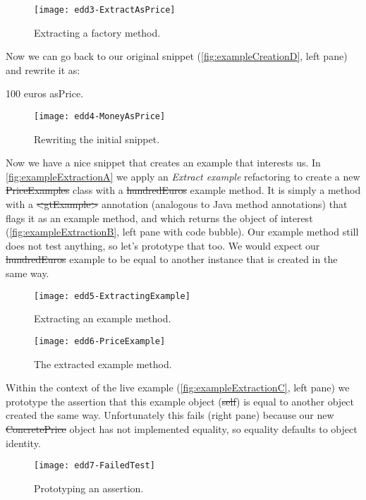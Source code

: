 \documentclass[sigplan,anonymous,review,10pt]{acmart}
\begin{document}
\begin{figure}[h]
  \texttt{[image: edd3-ExtractAsPrice]}
	\caption{Extracting a factory method.}
  \label{fig:exampleCreationC}
\end{figure}

Now we can go back to our original snippet (\autoref{fig:exampleCreationD}, left pane) and rewrite it as:
\begin{code}
100 euros asPrice.
\end{code}

\begin{figure}[h]
  \texttt{[image: edd4-MoneyAsPrice]}
	\caption{Rewriting the initial snippet.}
  \label{fig:exampleCreationD}
\end{figure}

Now we have a nice snippet that creates an example that interests us.
In \autoref{fig:exampleExtractionA} we apply an \emph{Extract example} refactoring to create a new \st{PriceExamples} class with a \st{hundredEuros} example  method.
It is simply a method with a \st{<gtExample>} annotation (analogous to Java method annotations) that flags it as an example method, and which returns the object of interest (\autoref{fig:exampleExtractionB}, left pane with code bubble).
Our example method still does not test anything, so let's prototype that too.
We would expect our \st{hundredEuros} example to be equal to another instance that is created in the same way.

\begin{figure}[h]
  \texttt{[image: edd5-ExtractingExample]}
	\caption{Extracting an example method.}
  \label{fig:exampleExtractionA}
\end{figure}

\begin{figure}[h]
  \texttt{[image: edd6-PriceExample]}
	\caption{The extracted example method.}
  \label{fig:exampleExtractionB}
\end{figure}

Within the context of the live example (\autoref{fig:exampleExtractionC}, left pane) we prototype the assertion that this example object (\ie \st{self}) is equal to another object created the same way.
Unfortunately this fails (right pane) because our new \st{ConcretePrice} object has not implemented equality, so equality defaults to object identity.
\begin{figure}[h]
  \texttt{[image: edd7-FailedTest]}
	\caption{Prototyping an assertion.}
  \label{fig:exampleExtractionC}
\end{figure}
\end{document}
